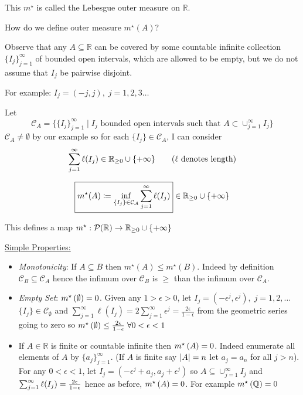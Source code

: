 This $m^{\star}$ is called the Lebesgue outer measure on $\mathbb{R}$.

How do we define outer measure $m^{\star}(A)$?

Observe that any $A \subseteq \mathbb{R}$ can be covered by some countable infinite collection $\{ I_j \}_{j=1}^{\infty}$ of bounded open intervals, which are allowed to be empty, but we do not assume that $I_j$ be pairwise disjoint.

For example: $I_j = (-j, j), \; j=1,2,3\hdots$

Let
\[
    \mathcal{C}_A = \{ \{I_j\}_{j=1}^{\infty} \mid I_j \text{ bounded open intervals such that } A \subset \cup_{j=1}^{\infty} I_j \}
\]
$\mathcal{C}_A \neq \emptyset$ by our example so for each $\{ I_j \} \in \mathcal{C}_A$, I can consider
\[
    \sum_{j=1}^{\infty} \ell(I_j) \in \mathbb{R}_{\geq 0} \cup \{ + \infty \} \tag{$\ell$ denotes length}
\]

\begin{definition}
    \[
        \boxed{m^{\star}(A) \coloneqq \inf_{\{ I_j \} \in \mathcal{C_A}} \sum_{j=1}^{\infty} \ell (I_j)  } \in \mathbb{R}_{\geq 0} \cup \{ + \infty \}
    \]
\end{definition}

This defines a map $m^{\star}: \mathcal{P}(\mathbb{R}) \rightarrow \mathbb{R}_{\geq 0} \cup \{ + \infty \}$

\underline{Simple Properties:}

\begin{itemize}
    \item \emph{Monotonicity}:
    If $A \subseteq B$ then $m^{\star}(A) \leq m^{\star}(B)$.
    Indeed by definition $\mathcal{C}_B \subseteq \mathcal{C}_A$ hence the infimum over $\mathcal{C}_B$ is $\geq$ than the infimum over $\mathcal{C}_A$.
    \item \emph{Empty Set}: $m^{\star}\left(\emptyset\right) = 0$.
    Given any $1 > \epsilon > 0$, let $I_j = (-\epsilon^{j}, \epsilon^j), \; j=1,2,\hdots$
    $\{I_j\} \in \mathcal{C}_{\emptyset}$ and $\sum_{j=1}^{\infty} \ell (I_j) = 2 \sum_{j=1}^{\infty} \epsilon^j = \frac{2\epsilon}{1-\epsilon} $ from the geometric series going to zero so $m^{\star}\left(\emptyset\right) \leq \frac{2\epsilon}{1-\epsilon} \; \forall 0 < \epsilon < 1$
    \item If $A \in \mathbb{R}$ is finite or countable infinite then $m^{\star}\left(A\right) = 0$.
    Indeed enumerate all elements of $A$ by $\{ a_j \}_{j=1}^{\infty}$.
    (If $A$ is finite say $\lvert A\rvert = n$ let $a_j = a_n$ for all $j > n$).
    For any $0 < \epsilon < 1$, let $I_j = \left( -\epsilon^j + a_j, a_j + \epsilon^j \right)$ so $A \subseteq \cup_{j=1}^{\infty} I_j$ and $\sum_{j=1}^{\infty} \ell (I_j) = \frac{2\epsilon}{1-\epsilon}$ hence as before, $m^{\star}\left(A\right) = 0$.
    For example $m^{\star}\left(\mathbb{Q}\right) = 0$
\end{itemize}

